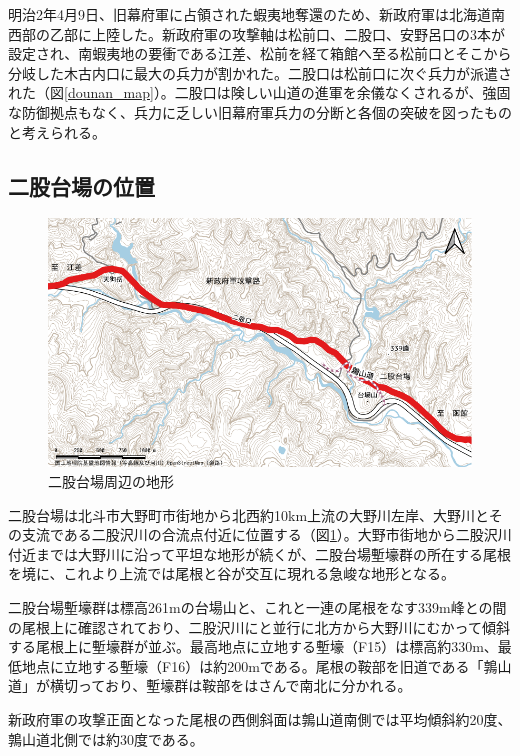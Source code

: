 \documentclass[11pt,report]{jsarticle}
\begin{document}
明治2年4月9日、旧幕府軍に占領された蝦夷地奪還のため、新政府軍は北海道南西部の乙部に上陸した。新政府軍の攻撃軸は松前口、二股口、安野呂口の3本が設定され、南蝦夷地の要衝である江差、松前を経て箱館へ至る松前口とそこから分岐した木古内口に最大の兵力が割かれた。二股口は松前口に次ぐ兵力が派遣された（図\ref{dounan_map}）。二股口は険しい山道の進軍を余儀なくされるが、強固な防御拠点もなく、兵力に乏しい旧幕府軍兵力の分断と各個の突破を図ったものと考えられる。

\subsection{二股台場の位置}

\begin{figure}[ht]
\centering
\includegraphics[width=160truemm]{../02fig/02futamata_map.pdf}
\caption{二股台場周辺の地形}
\label{futamata_map}
\end{figure}

二股台場は北斗市大野町市街地から北西約10km上流の大野川左岸、大野川とその支流である二股沢川の合流点付近に位置する（図\ref{futamata_map}）。大野市街地から二股沢川付近までは大野川に沿って平坦な地形が続くが、二股台場塹壕群の所在する尾根を境に、これより上流では尾根と谷が交互に現れる急峻な地形となる。

二股台場塹壕群は標高261mの台場山と、これと一連の尾根をなす339m峰との間の尾根上に確認されており、二股沢川にと並行に北方から大野川にむかって傾斜する尾根上に塹壕群が並ぶ。最高地点に立地する塹壕（F15）は標高約330m、最低地点に立地する塹壕（F16）は約200mである。尾根の鞍部を旧道である「鶉山道」が横切っており、塹壕群は鞍部をはさんで南北に分かれる。

新政府軍の攻撃正面となった尾根の西側斜面は鶉山道南側では平均傾斜約20度、鶉山道北側では約30度である。
\end{document}
